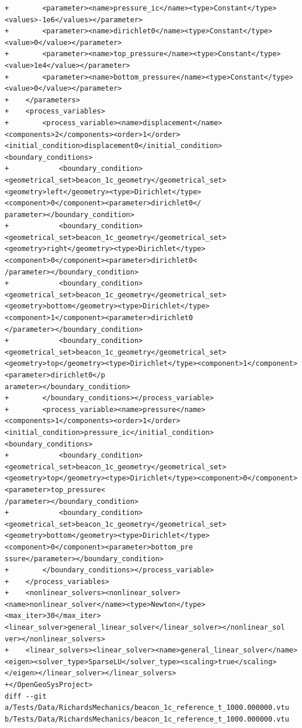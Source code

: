 \documentclass[10pt]{article}
\begin{document}
\begin{lstlisting}
+        <parameter><name>pressure_ic</name><type>Constant</type><values>-1e6</values></parameter>
+        <parameter><name>dirichlet0</name><type>Constant</type><value>0</value></parameter>
+        <parameter><name>top_pressure</name><type>Constant</type><value>1e4</value></parameter>
+        <parameter><name>bottom_pressure</name><type>Constant</type><value>0</value></parameter>
+    </parameters>
+    <process_variables>
+        <process_variable><name>displacement</name><components>2</components><order>1</order><initial_condition>displacement0</initial_condition><boundary_conditions>
+            <boundary_condition><geometrical_set>beacon_1c_geometry</geometrical_set><geometry>left</geometry><type>Dirichlet</type><component>0</component><parameter>dirichlet0</
parameter></boundary_condition>
+            <boundary_condition><geometrical_set>beacon_1c_geometry</geometrical_set><geometry>right</geometry><type>Dirichlet</type><component>0</component><parameter>dirichlet0<
/parameter></boundary_condition>
+            <boundary_condition><geometrical_set>beacon_1c_geometry</geometrical_set><geometry>bottom</geometry><type>Dirichlet</type><component>1</component><parameter>dirichlet0
</parameter></boundary_condition>
+            <boundary_condition><geometrical_set>beacon_1c_geometry</geometrical_set><geometry>top</geometry><type>Dirichlet</type><component>1</component><parameter>dirichlet0</p
arameter></boundary_condition>
+        </boundary_conditions></process_variable>
+        <process_variable><name>pressure</name><components>1</components><order>1</order><initial_condition>pressure_ic</initial_condition><boundary_conditions>
+            <boundary_condition><geometrical_set>beacon_1c_geometry</geometrical_set><geometry>top</geometry><type>Dirichlet</type><component>0</component><parameter>top_pressure<
/parameter></boundary_condition>
+            <boundary_condition><geometrical_set>beacon_1c_geometry</geometrical_set><geometry>bottom</geometry><type>Dirichlet</type><component>0</component><parameter>bottom_pre
ssure</parameter></boundary_condition>
+        </boundary_conditions></process_variable>
+    </process_variables>
+    <nonlinear_solvers><nonlinear_solver><name>nonlinear_solver</name><type>Newton</type><max_iter>30</max_iter><linear_solver>general_linear_solver</linear_solver></nonlinear_sol
ver></nonlinear_solvers>
+    <linear_solvers><linear_solver><name>general_linear_solver</name><eigen><solver_type>SparseLU</solver_type><scaling>true</scaling></eigen></linear_solver></linear_solvers>
+</OpenGeoSysProject>
diff --git a/Tests/Data/RichardsMechanics/beacon_1c_reference_t_1000.000000.vtu b/Tests/Data/RichardsMechanics/beacon_1c_reference_t_1000.000000.vtu

\end{lstlisting}
\end{document}
